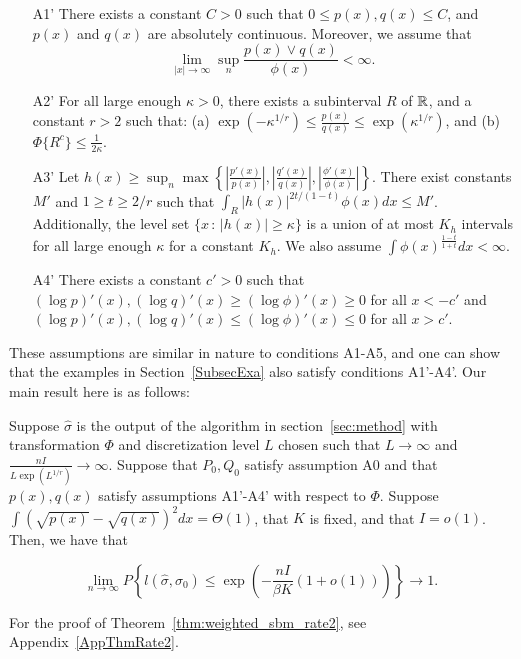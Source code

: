 \begin{enumerate}
\item[A1'] There exists a constant $C >0$ such that $0 \leq p(x), q(x) \leq C$, and $p(x)$ and $q(x)$ are absolutely continuous.  Moreover, we assume that 
$$\lim_{|x| \rightarrow \infty} \sup_n \frac{p(x) \vee q(x)}{\phi(x)} < \infty.$$
\item[A2'] For all large enough $\kappa > 0$, there exists a subinterval $R$ of ${\mathbb R}$, and a constant $r > 2$ such that: (a) $\exp(-\kappa^{1/r}) \leq \frac{p(x)}{q(x)} \leq \exp(\kappa^{1/r})$, and (b) $\Phi \{ R^c \} \leq \frac{1}{2\kappa}.$
\item[A3'] Let $h(x) \geq \sup_n \max \left\{  \left|\frac{p'(x)}{p(x)} \right|, 
 \left|\frac{q'(x)}{q(x)}\right|, \left| \frac{\phi'(x)}{\phi(x)}\right|  \right\} $. There exist constants $M'$ and $1 \geq t \geq 2/r$ such that $\int_R |h(x)|^{2t/(1-t)} \phi(x) dx \leq M'$. Additionally, the level set $\{x \,:\, |h(x)| \geq \kappa\}$ is a union of at most $K_h$ intervals for all large enough $\kappa$ for a constant $K_h$. We also assume $\int \phi(x)^{\frac{1-t}{1+t}} dx < \infty$.
\item[A4']  There exists a constant $c'>0$ such that $(\log p)'(x), (\log q)'(x) \geq (\log \phi)'(x) \geq 0$ for all $x < -c'$ and $ (\log p)'(x), (\log q)'(x) \leq (\log \phi)'(x) \leq 0$ for all $x > c'$.
\end{enumerate}

These assumptions are similar in nature to conditions A1-A5, and one can show that the examples in Section~\ref{SubsecExa} also satisfy conditions A1'-A4'. Our main result here is as follows:

\begin{theorem}
\label{thm:weighted_sbm_rate2}
Suppose $\hat{\sigma}$ is the output of the algorithm in section~\ref{sec:method} with transformation $\Phi$ and discretization level $L$ chosen such that $L \rightarrow \infty$ and $\frac{n I}{ L \exp(L^{1/r}) } \rightarrow \infty$. Suppose that $P_0, Q_0$ satisfy assumption A0 and that $p(x), q(x)$ satisfy assumptions A1'-A4' with respect to $\Phi$. Suppose $\int (\sqrt{p(x)} - \sqrt{q(x)})^2 dx = \Theta(1)$, that $K$ is fixed, and that $I = o(1)$. Then, we have that

\[
\lim_{n \rightarrow \infty} P \left\{
     l(\hat{\sigma}, \sigma_0) \leq \exp\left( - \frac{nI}{\beta K} (1 + o(1)) \right)
    \right\} \rightarrow 1.
\]
\end{theorem}
For the proof of Theorem~\ref{thm:weighted_sbm_rate2}, see Appendix~\ref{AppThmRate2}.

